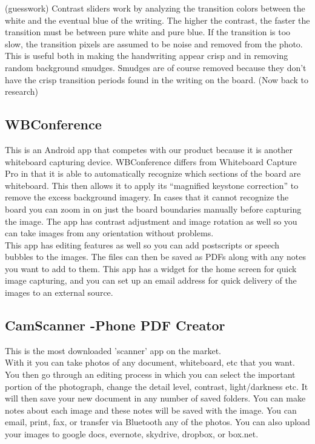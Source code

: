 \documentclass[]{article}
\begin{document}
			(guesswork)
			Contrast sliders work by analyzing the transition colors between the white and the eventual blue of the writing. The higher the contrast, the faster the transition must be between pure white and pure blue. If the transition is too slow, the transition pixels are assumed to be noise and removed from the photo. This is useful both in making the handwriting appear crisp and in removing random background smudges. Smudges are of course removed because they don’t have the crisp transition periods found in the writing on the board.
			(Now back to research)
			
		\subsection{WBConference}
			This is an Android app that competes with our product because it is another whiteboard capturing device. WBConference differs from Whiteboard Capture Pro in that it is able to automatically recognize which sections of the board are whiteboard. This then allows it to apply its “magnified keystone correction” to remove the excess background imagery. In cases that it cannot recognize the board you can zoom in on just the board boundaries manually before capturing the image. The app has contrast adjustment and image rotation as well so you can take images from any orientation without problems.\\
			
			This app has editing features as well so you can add postscripts or speech bubbles to the images. The files can then be saved as PDFs along with any notes you want to add to them. This app has a widget for the home screen for quick image capturing, and you can set up an email address for quick delivery of the images to an external source.\\

		\subsection{CamScanner -Phone PDF Creator}
			This is the most downloaded 'scanner' app on the market.\\
			
			With it you can take photos of any document, whiteboard, etc that you want. You then go through an editing process in which you can select the important portion of the photograph, change the detail level, contrast, light/darkness etc. It will then save your new document in any number of saved folders. You can make notes about each image and these notes will be saved with the image. You can email, print, fax, or transfer via Bluetooth any of the photos. You can also upload your images to google docs, evernote, skydrive, dropbox, or box.net. \\
			
\end{document}
